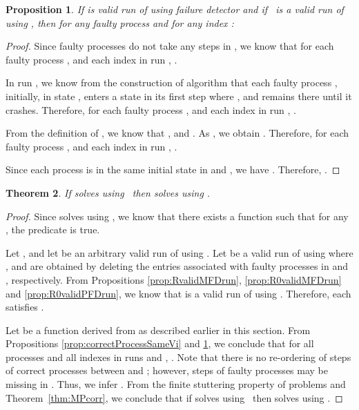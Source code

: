 \documentclass[11pt]{article}
\newtheorem{proposition}{Proposition}[section]
\newtheorem{theorem}[proposition]{Theorem}
\begin{document}
\begin{proposition}\label{prop:faultyProcessSameVi}
If   is valid run of  using failure detector 
     and if~ is a valid run of  using ,
     then for any faulty process  and for any index :
 

\end{proposition} 

\begin{proof}
Since faulty processes do not take any steps in , we know that
     for each faulty process , and each index  in
     run , .

In run , we know from the construction of algorithm
      that each faulty process , initially, in state
     , enters a state  in its first step where , and remains there until it crashes.
Therefore, for each faulty process , and each index 
     in run , .

From the definition of , we know that
     , and
     .
As , we obtain
     .
Therefore, for each faulty process , and each index 
     in run , .

Since each process  is in the same initial state in
      and , we have .
Therefore, .
\end{proof}




\begin{theorem} 
If  solves  using~ then
      solves  using .
\end{theorem}
\begin{proof}
 Since   solves  using , we know that there exists a function  such that for any ,  the predicate  is true.

Let , and let  be an
     arbitrary valid run of  using .
Let  be a valid run of 
     using  where , 
     and  are obtained by deleting the entries associated with
     faulty processes in  and ,
     respectively.
From Propositions  \ref{prop:RvalidMFDrun}, \ref{prop:R0validMFDrun}
     and \ref{prop:R0validPFDrun}, we know that  is a valid run
     of  using .
Therefore, each   satisfies
     .

Let  be a function derived from  as
     described earlier in this section.
From Propositions \ref{prop:correctProcessSameVi} and
     \ref{prop:faultyProcessSameVi}, we conclude that  for all
     processes  and all indexes  in runs 
     and , .
Note that there is no re-ordering of steps of correct processes
     between  and ; however, steps of faulty
     processes may be missing in .
Thus, we infer .
From the finite stuttering property of problems and
     Theorem~\ref{thm:MPcorr}, we conclude that if  solves
      using~ then 
     solves  using .
\end{proof}
\end{document}
